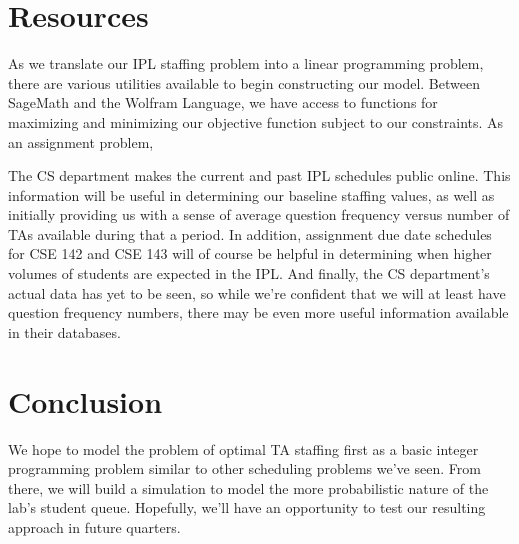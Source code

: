 \documentclass{article}
\begin{document}
\begin{multicols}{2}
\section*{Resources}
As we translate our IPL staffing problem into a linear programming problem, there are various utilities available to begin constructing our model. Between SageMath and the Wolfram Language, we have access to functions for maximizing and minimizing our objective function subject to our constraints. As an assignment problem, 

The CS department makes the current and past IPL schedules public online. This information will be useful in determining our baseline staffing values, as well as initially providing us with a sense of average question frequency versus number of TAs available during that a period. In addition, assignment due date schedules for CSE 142 and CSE 143 will of course be helpful in determining when higher volumes of students are expected in the IPL. And finally, the CS department’s actual data has yet to be seen, so while we’re confident that we will at least have question frequency numbers, there may be even more useful information available in their databases.

\section*{Conclusion}
We hope to model the problem of optimal TA staffing first as a basic integer programming problem similar to other scheduling problems we've seen. From there, we will build a simulation to model the more probabilistic nature of the lab’s student queue. Hopefully, we'll have an opportunity to test our resulting approach in future quarters.

\end{multicols}
\end{document}
